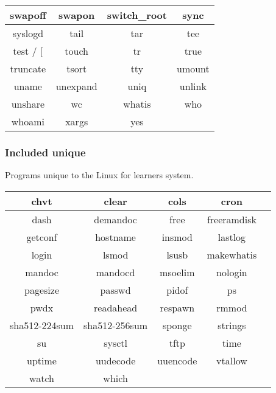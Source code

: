 \begin{center}
\begin{tabular}{|c|c|c|c|}
        \hline
        swapoff & swapon & switch\_root & sync \\
        \hline
        syslogd & tail & tar & tee \\
        \hline
        test / [ & touch & tr & true \\
        \hline
        truncate & tsort & tty & umount \\
        \hline
        uname & unexpand & uniq & unlink \\
        \hline
        unshare & wc & whatis & who \\
        \hline
        whoami & xargs & yes \\
        \cline{1-3}
    \end{tabular}
\end{center}

\newpage

\subsubsection{Included unique}

Programs unique to the Linux for learners system.

\begin{center}
    \begin{tabular}{|c|c|c|c|c|}
        \hline
        chvt & clear & cols & cron \\
        \hline
        dash & demandoc & free & freeramdisk \\
        \hline
        getconf & hostname & insmod & lastlog \\
        \hline
        login & lsmod & lsusb & makewhatis \\
        \hline
        mandoc & mandocd & msoelim & nologin \\
        \hline
        pagesize & passwd & pidof & ps \\
        \hline
        pwdx & readahead & respawn & rmmod \\
        \hline
        sha512-224sum & sha512-256sum & sponge & strings \\
        \hline
        su & sysctl & tftp & time \\
        \hline
        uptime & uudecode & uuencode & vtallow \\
        \hline
        watch & which \\
        \cline{1-2}
    \end{tabular}
\end{center}

